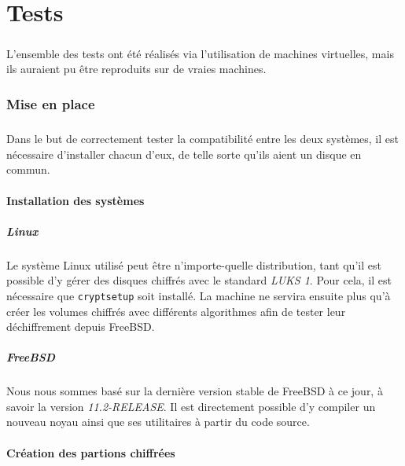 \chapter{Tests}

\paragraph{}
L'ensemble des tests ont été réalisés via l'utilisation de machines virtuelles,
mais ils auraient pu être reproduits sur de vraies machines.

\subsection{Mise en place}

\paragraph{}
Dans le but de correctement tester la compatibilité entre les deux systèmes, il
est nécessaire d'installer chacun d'eux, de telle sorte qu'ils aient un disque
en commun.

\subsubsection{Installation des systèmes}
\paragraph{Linux}
Le système Linux utilisé peut être n'importe-quelle distribution, tant qu'il est
possible d'y gérer des disques chiffrés avec le standard \textit{LUKS 1}. Pour
cela, il est nécessaire que \texttt{cryptsetup} soit installé. La machine ne
servira ensuite plus qu'à créer les volumes chiffrés avec différents algorithmes
afin de tester leur déchiffrement depuis FreeBSD.
\paragraph{FreeBSD}
Nous nous sommes basé sur la dernière version stable de FreeBSD à ce jour, à
savoir la version \textit{11.2-RELEASE}. Il est directement possible d'y
compiler un nouveau noyau ainsi que ses utilitaires à partir du code source.

\subsubsection{Création des partions chiffrées}
